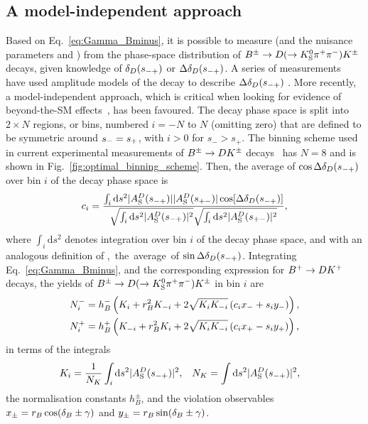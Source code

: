 \subsection{A model-independent approach} %
\label{sub:a_model_independent_approach}


Based on Eq.~\eqref{eq:Gamma_Bminus}, it is possible to measure \g (and the nuisance parameters \rB and \dB) from the phase-space distribution of ${{B}^\pm}\rightarrow{\ensuremath{D}}(\rightarrow{\ensuremath{{K}^0_{\mathrm{S}}}} \pi^+ \pi^-){{K}^\pm}$ decays, given knowledge of $\delta_D(s_{-+})$ or $\Delta\delta_D(s_{-+})$. A series of \g measurements have used amplitude models of the \D decay to describe $\Delta\delta_D(s_{-+})$ \cite{BABAR2005,BABAR2008,BABAR2010, BELLE2004,BELLE2006,BELLE2010,LHCb-PAPER-2014-017,LHCb-PAPER-2016-007}. More recently, a model-independent approach, which is critical when looking for evidence of beyond-the-SM effects~\cite{BELLEMODIND,LHCb-PAPER-2014-041,LHCb-PAPER-2016-006,LHCb-PAPER-2018-017}, has been favoured. The \D decay phase space is split into $2\times N$ regions, or bins, numbered $i=-N$ to $N$ (omitting zero) that are defined to be symmetric around $s_-=s_+$, with $i>0$ for $s_- >s_+$. The binning scheme used in current experimental measurements of ${{B}^\pm}\rightarrow{\ensuremath{D}}{\ensuremath{{K}^\pm}}$ decays~\cite{BELLEMODIND,LHCb-PAPER-2014-041,LHCb-PAPER-2018-017} has $N=8$ and is shown in Fig.~\ref{fig:optimal_binning_scheme}. Then, the average of $\cos \Delta\delta_D(s_{-+})$ over bin $i$ of the \D decay phase space is
\begin{align}\label{eq:ci_si}
    c_i = \frac
    {\int_i \text{d}s^2 |A_{\rm S}^{D}(s_{-+})||A_{\rm S}^{D}(s_{+-})|\cos[\Delta\delta_D(s_{-+})]}
    {\sqrt{\int_i \text{d}s^2 |A_{\rm S}^{D}(s_{-+})|^2}\sqrt{\int_i \text{d}s^2 |A_{\rm S}^{D}(s_{+-})|^2}},
\end{align}
where $\int_i\text{d}s^2$ denotes integration over bin $i$ of the \D decay phase space, and with an analogous definition of \si, the average of $\sin \Delta\delta_D(s_{-+})$.  Integrating Eq.~\eqref{eq:Gamma_Bminus}, and the corresponding expression for ${{{B}^+}}\rightarrow{\ensuremath{D}}{\ensuremath{{K}^+}}$ decays, the yields of ${{B}^\pm}\rightarrow{\ensuremath{D}}(\rightarrow{\ensuremath{{K}^0_{\mathrm{S}}}} \pi^+\pi^-){{K}^\pm}$ in bin $i$ are
\begin{align}
\begin{split}    \label{eq:base_yields}
    N^-_i &= h_B^-\left(K_i + r_{B}^2K_{-i} + 2\sqrt{K_iK_{-i}}\left(c_ix_-+s_iy_-\right)\right), \\
    N^+_i &= h_B^+\left(K_{-i} + r_{B}^2K_i + 2\sqrt{K_iK_{-i}}\left(c_ix_+-s_iy_+\right)\right),
\end{split}
\end{align}
in terms of the integrals 
\begin{align}\label{eq:base_ki}
    K_i &= \frac{1}{N_K}\int_i\text{d}s^2 |A_{\rm S}^{D}(s_{-+})|^2, &
    N_K &=\int\text{d}s^2 |A_{\rm S}^{D}(s_{-+})|^2,
\end{align}the normalisation constants $h^\pm_B$, and the \CP violation observables ${x_\pm = r_{B} \cos (\delta_{B} \pm \gamma)}$ and $ y_\pm = r_{B} \sin (\delta_{B} \pm \gamma)$.

